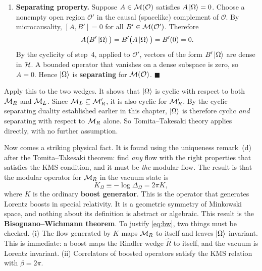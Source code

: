 \begin{keyresult}
\begin{enumerate}[leftmargin=*]
\item \textbf{Separating property.}
Suppose $A \in \mathcal{M}(\mathcal{O})$ satisfies $A\ket\Omega = 0$. Choose a nonempty open region $\mathcal{O}'$ in
the causal (spacelike) complement of $\mathcal{O}$. By microcausality, $[A, B'] = 0$ for all
$B' \in \mathcal{M}(\mathcal{O}')$. Therefore
\[
A \big(B'\ket\Omega\big) = B' \big(A\ket\Omega\big) = B'(0) = 0 .
\]
By the cyclicity of step~4, applied to $\mathcal O'$, vectors of the form $B'\ket\Omega$ are dense in $\mathcal{H}$.
A bounded operator that vanishes on a dense subspace is zero, so $A = 0$. Hence $\ket\Omega$ is
\textbf{separating} for $\mathcal{M}(\mathcal{O})$. $\blacksquare$
\end{enumerate}
\end{keyresult}

Apply this to the two wedges. It shows that $\ket\Omega$ is cyclic with respect to both $\mathcal{M}_R$ and $\mathcal{M}_L$.
Since $\mathcal{M}_L\subseteq\mathcal{M}_R'$, it is also cyclic for $\mathcal{M}_R'$. By the cyclic--separating duality established
earlier in this chapter, $\ket\Omega$ is therefore cyclic \emph{and} separating with respect to $\mathcal{M}_R$ alone. So
Tomita--Takesaki theory applies directly, with no further assumption.

Now comes a striking physical fact. It is found using the uniqueness remark~(d) after the Tomita--Takesaki
theorem: find \emph{any} flow with the right properties that satisfies the KMS condition, and it must be
\emph{the} modular flow. The result is that the modular operator for $\mathcal{M}_R$ in the vacuum state is
\begin{equation}
K_\Omega \equiv -\log\Delta_\Omega = 2\pi K ,
\label{eq:bw}
\end{equation}
where $K$ is the ordinary \textbf{boost generator}. This is the operator that generates Lorentz boosts in
special relativity. It is a geometric symmetry of Minkowski space, and nothing about its definition is abstract
or algebraic. This result is the \textbf{Bisognano--Wichmann theorem}. To justify \eqref{eq:bw}, two things must
be checked. (i) The flow generated by $K$ maps $\mathcal{M}_R$ to itself and leaves $\ket\Omega$ invariant. This is
immediate: a boost maps the Rindler wedge $\widehat R$ to itself, and the vacuum is Lorentz invariant. (ii)
Correlators of boosted operators satisfy the KMS relation with $\beta=2\pi$.

